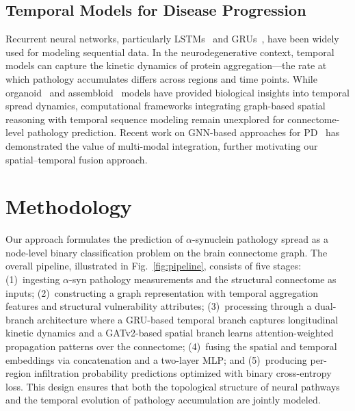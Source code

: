 \documentclass[conference]{IEEEtran}
\begin{document}
\subsection{Temporal Models for Disease Progression}
Recurrent neural networks, particularly LSTMs~\cite{hochreiter1997long} and GRUs~\cite{cho2014learning}, have been widely used for modeling sequential data. In the neurodegenerative context, temporal models can capture the kinetic dynamics of protein aggregation—the rate at which pathology accumulates differs across regions and time points. While organoid~\cite{gonzalez2018modeling} and assembloid~\cite{primo2025synuclein} models have provided biological insights into temporal spread dynamics, computational frameworks integrating graph-based spatial reasoning with temporal sequence modeling remain unexplored for connectome-level pathology prediction. Recent work on GNN-based approaches for PD~\cite{xu2025multimodal} has demonstrated the value of multi-modal integration, further motivating our spatial--temporal fusion approach.

\section{Methodology}

Our approach formulates the prediction of $\alpha$-synuclein pathology spread as a node-level binary classification problem on the brain connectome graph. The overall pipeline, illustrated in Fig.~\ref{fig:pipeline}, consists of five stages: (1)~ingesting $\alpha$-syn pathology measurements and the structural connectome as inputs; (2)~constructing a graph representation with temporal aggregation features and structural vulnerability attributes; (3)~processing through a dual-branch architecture where a GRU-based temporal branch captures longitudinal kinetic dynamics and a GATv2-based spatial branch learns attention-weighted propagation patterns over the connectome; (4)~fusing the spatial and temporal embeddings via concatenation and a two-layer MLP; and (5)~producing per-region infiltration probability predictions optimized with binary cross-entropy loss. This design ensures that both the topological structure of neural pathways and the temporal evolution of pathology accumulation are jointly modeled.
\end{document}
